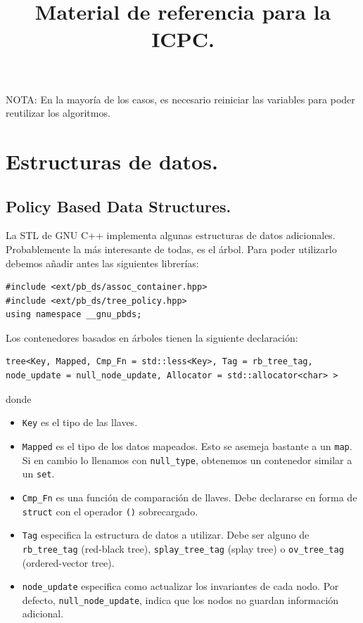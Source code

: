 \documentclass[11pt, letterpaper, twoside]{article}
\title{Material de referencia para la ICPC.}
\author{}
\date{}
\begin{document}
\maketitle

\tableofcontents

\bigskip

\noindent NOTA: En la mayoría de los casos, es necesario reiniciar las variables para poder reutilizar los algoritmos.

\newpage

\section{Estructuras de datos.}

\subsection{Policy Based Data Structures.}

La STL de GNU C++ implementa algunas estructuras de datos adicionales. Probablemente la más interesante de todas, es el árbol. Para poder utilizarlo debemos añadir antes las siguientes librerías:

\begin{lstlisting}
#include <ext/pb_ds/assoc_container.hpp>
#include <ext/pb_ds/tree_policy.hpp>
using namespace __gnu_pbds;
\end{lstlisting}

Los contenedores basados en árboles tienen la siguiente declaración:

\begin{lstlisting}
tree<Key, Mapped, Cmp_Fn = std::less<Key>, Tag = rb_tree_tag, node_update = null_node_update, Allocator = std::allocator<char> >
\end{lstlisting}

donde
\begin{itemize}
\item \texttt{Key} es el tipo de las llaves.

\item \texttt{Mapped} es el tipo de los datos mapeados. Esto se asemeja bastante a un \texttt{map}. Si en cambio lo llenamos con \texttt{null\_type}, obtenemos un contenedor similar a un \texttt{set}.

\item \texttt{Cmp\_Fn} es una función de comparación de llaves. Debe declararse en forma de \texttt{struct} con el operador \texttt{()} sobrecargado.

\item \texttt{Tag} especifica la estructura de datos a utilizar. Debe ser alguno de \texttt{rb\_tree\_tag} (red-black tree), \texttt{splay\_tree\_tag} (splay tree) o \texttt{ov\_tree\_tag} (ordered-vector tree).

\item \texttt{node\_update} especifica como actualizar los invariantes de cada nodo. Por defecto, \texttt{null\_node\_update}, indica que los nodos no guardan información adicional.
\end{itemize}
\end{document}

